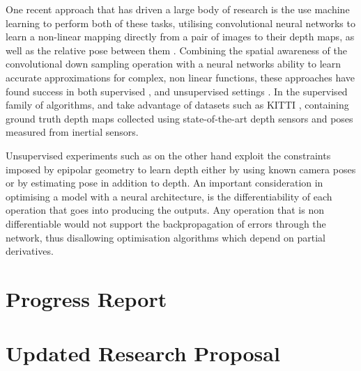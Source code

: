 \documentclass[openany]{book}
\begin{document}
One recent approach that has driven a large body of research is the use machine learning to perform both of these tasks, utilising convolutional neural networks to learn a non-linear mapping directly from a pair of images to their depth maps, as well as the relative pose between them \cite{eigen2014supervised, garg2016unsupervised,godard2016consistency, liu2015supervised, zhou2017unsupervised}. Combining the spatial awareness of the convolutional down sampling operation with a neural networks ability to learn accurate approximations for complex, non linear functions, these approaches have found success in both supervised \cite{liu2015supervised, eigen2014supervised}, and unsupervised settings \cite{garg2016unsupervised, godard2016consistency, zhou2017unsupervised}. In the supervised family of algorithms, \cite{eigen2014supervised} and \cite{liu2015supervised} take advantage of datasets such as KITTI \cite{dataset-kitti}, containing ground truth depth maps collected using state-of-the-art depth sensors and poses measured from inertial sensors. 

Unsupervised experiments such as \cite{garg2016unsupervised, godard2016consistency,zhou2017unsupervised} on the other hand exploit the constraints imposed by epipolar geometry to learn depth either by using known camera poses or by estimating pose in addition to depth. An important consideration in optimising a model with a neural architecture, is the differentiability of each operation that goes into producing the outputs. Any operation that is non differentiable would not support the backpropagation of errors through the network, thus disallowing optimisation algorithms which depend on partial derivatives. 




\chapter{Progress Report}

\chapter{Updated Research Proposal}


\newpage



\end{document}
